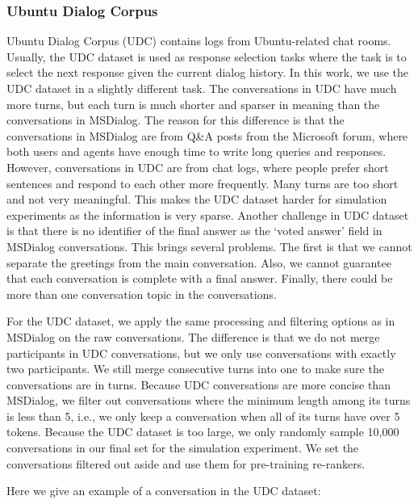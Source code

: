 \documentclass[format=acmsmall, review=False, screen=true]{acmart}
\begin{document}
\subsubsection{\textbf{Ubuntu Dialog Corpus}}

Ubuntu Dialog Corpus (UDC) contains logs from Ubuntu-related chat rooms. Usually, the UDC dataset is used as response selection tasks where the task is to select the next response given the current dialog history. In this work, we use the UDC dataset in a slightly different task. The conversations in UDC have much more turns, but each turn is much shorter and sparser in meaning than the conversations in MSDialog. The reason for this difference is that the conversations in MSDialog are from Q\&A posts from the Microsoft forum, where both users and agents have enough time to write long queries and responses. However, conversations in UDC are from chat logs, where people prefer short sentences and respond to each other more frequently. Many turns are too short and not very meaningful. This makes the UDC dataset harder for simulation experiments as the information is very sparse. Another challenge in UDC dataset is that there is no identifier of the final answer as the `voted answer' field in MSDialog conversations. This brings several problems. The first is that we cannot separate the greetings from the main conversation. Also, we cannot guarantee that each conversation is complete with a final answer. Finally, there could be more than one conversation topic in the conversations.

For the UDC dataset, we apply the same processing and filtering options as in MSDialog on the raw conversations. The difference is that we do not merge participants in UDC conversations, but we only use conversations with exactly two participants. We still merge consecutive turns into one to make sure the conversations are in turns. Because UDC conversations are more concise than MSDialog, we filter out conversations where the minimum length among its turns is less than 5, i.e., we only keep a conversation when all of its turns have over 5 tokens. Because the UDC dataset is too large, we only randomly sample 10,000 conversations in our final set for the simulation experiment. We set the conversations filtered out aside and use them for pre-training re-rankers.

Here we give an example of a conversation in the UDC dataset:
\end{document}
